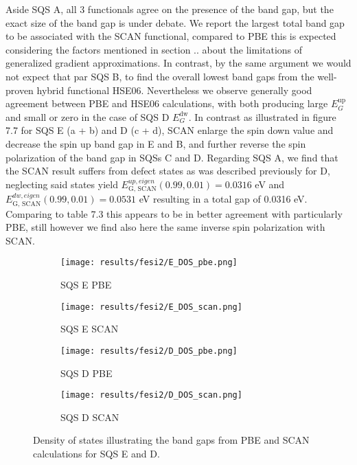 Aside SQS A, all 3 functionals agree on the presence of the band gap, but the exact size of the band gap is under debate. We report the largest total band gap to be associated with the SCAN functional, compared to PBE this is expected considering the factors mentioned in section .. about the limitations of generalized gradient approximations. In contrast, by the same argument we would not expect that par SQS B, to find the overall lowest band gaps from the well-proven hybrid functional HSE06. Nevertheless we observe generally good agreement between PBE and HSE06 calculations, with both producing large $E_G ^\text{up}$ and small or zero in the case of SQS D $E_G ^\text{dw}$. In contrast as illustrated in figure 7.7 for SQS E (a + b) and D (c + d), SCAN enlarge the spin down value and decrease the spin up band gap in E and B, and further reverse the spin polarization of the band gap in SQSs C and D. Regarding SQS A, we find that the SCAN result suffers from defect states as was described previously for D, neglecting said states yield $E_\text{G, SCAN} ^{up, eigen}(0.99, 0.01) = 0.0316$ eV and $E_\text{G, SCAN} ^{dw, eigen}(0.99, 0.01) = 0.0531$ eV resulting in a total gap of 0.0316 eV. Comparing to table 7.3 this appears to be in better agreement with particularly PBE, still however we find also here the same inverse spin polarization with SCAN.  
 
\begin{figure}[H]
	\begin{subfigure}{.5\textwidth}
		\texttt{[image: results/fesi2/E\_DOS\_pbe.png]}
		\caption{SQS E PBE}
	\end{subfigure}
	\begin{subfigure}{.5\textwidth}
		\texttt{[image: results/fesi2/E\_DOS\_scan.png]}
		\caption{SQS E SCAN}
	\end{subfigure}
	\begin{subfigure}{.5\textwidth}
		\texttt{[image: results/fesi2/D\_DOS\_pbe.png]}
		\caption{SQS D PBE}
	\end{subfigure}
	\begin{subfigure}{.5\textwidth}
		\texttt{[image: results/fesi2/D\_DOS\_scan.png]}
		\caption{SQS D SCAN}
	\end{subfigure}
	\caption{Density of states illustrating the band gaps from PBE and SCAN calculations for SQS E and D.}
\end{figure}


